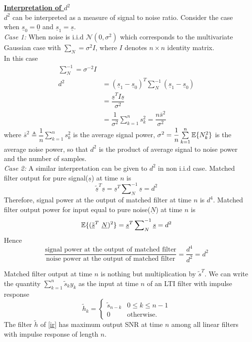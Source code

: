 \documentclass[a4paper,english,12pt]{article}
\begin{document}
\begin{note}\textbf{\underline{Interpretation of $d^2$}}\\
$d^2$ can be interpreted as a measure of signal to noise ratio. Consider the case when $\underline{s}_0=\underline{0}$ and $\underline{s}_1=\underline{s}$.\\

\noindent \textit{Case 1:} When noise is i.i.d $\mathcal{N}(0,\sigma ^2)$ which corresponds to the multivariate Gaussian case with $\sum_N=\sigma^2I$, where $I$ denotes $n\times n$ identity matrix.\\
In this case
\begin{align}
\sum\nolimits_N^{-1} = \sigma^{-2}I \nonumber \\
d^2 &=(\underline{s}_1-\underline{s}_0)^T \sum\nolimits_N^{-1} (\underline{s}_1-\underline{s}_0) \nonumber \\
&=\dfrac{\underline{s}^TI\underline{s}}{\sigma^2} \nonumber \\
&=\dfrac{1}{\sigma^2}\sum_{k=1}^{n}s_k^2=\dfrac{n\bar{s}^2}{\sigma^2}
\end{align}
where $\bar{s}^2 \triangleq \dfrac{1}{n}\sum\limits_{k=1}^n s_k^2$ is the average signal power, $\sigma^2 = \dfrac{1}{n} \sum\limits_{k=1}^n \mathbb{E} \{N_k^2 \}$ is the average noise power, so that $d^2$ is the product of average signal to noise power and the number of samples.\\

\noindent  \textit{Case 2:} A similar interpretation can be given to $d^2$ in non i.i.d case. Matched filter output for pure signal($\underline{s}$) at time $n$ is
$$\tilde{\underline{s}}^T \underline{s}=\underline{s}^T \sum\nolimits_N^{-1}\underline{s}=d^2$$
Therefore, signal power at the output of matched filter at  time $n$ is $d^4$. Matched filter output power for input equal to pure noise($\underline{N}$) at time $n$ is $$\E\{(\tilde{\underline{s}}^T \ \underline{N})^2\}= \underline{s}^T\sum\nolimits_N^{-1}\underline{s}=d^2$$
Hence
$$
\dfrac{\mbox{signal power at the output of matched filter}}{\mbox{noise power at the output of matched filter}} = \dfrac{d^4}{d^2} =d^2
$$

\end{note}

\vspace{1 cm}
\begin{note}
Matched filter output at time $n$ is nothing but multiplication by $\tilde{s}^T$. We can write the quantity $\sum\limits_{k=1}^n \tilde{s}_ky_k$ as the input at time $n$ of an LTI filter with impulse response   
\begin{equation}
\tilde{h}_k= \begin{cases}
\tilde{s}_{n-k} & 0 \leq k \leq n-1\\
0 &\mbox{otherwise}.
\end{cases}
\label{ir}
\end{equation}
The filter $\tilde{h}$ of \eqref{ir} has maximum output SNR at time $n$ among all linear filters with impulse response of length $n$.
 \end{note}
\vspace{1 cm}
\end{document}
